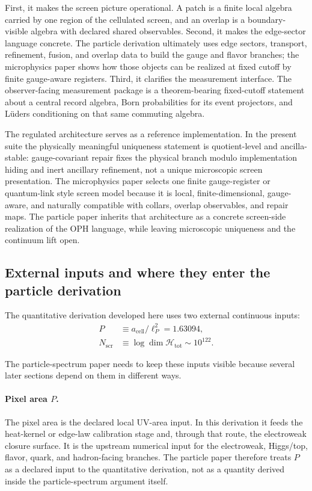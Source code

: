 \documentclass[11pt]{article}
\begin{document}
First, it makes the screen picture operational. A patch is a finite local algebra carried by one
region of the cellulated screen, and an overlap is a boundary-visible algebra with declared shared
observables. Second, it makes the edge-sector
language concrete. The particle derivation ultimately uses edge sectors, transport, refinement,
fusion, and overlap data to build the gauge and flavor branches; the microphysics paper shows
how those objects can be realized at fixed cutoff by finite gauge-aware registers.
Third, it clarifies the measurement interface. The observer-facing measurement package is a
theorem-bearing fixed-cutoff statement about a central record
algebra, Born probabilities for its event projectors, and L\"uders conditioning on that same
commuting algebra.

The regulated architecture serves as a reference implementation. In the present suite the
physically meaningful uniqueness statement is quotient-level and ancilla-stable: gauge-covariant
repair fixes the physical branch modulo implementation hiding and inert ancillary refinement, not
a unique microscopic screen presentation. The microphysics paper selects one finite
gauge-register or quantum-link style screen model because it is local, finite-dimensional,
gauge-aware, and naturally compatible with collars, overlap observables, and repair maps. The
particle paper inherits that architecture as a concrete screen-side realization of the OPH
language, while leaving microscopic uniqueness and the continuum lift open.

\subsection{External inputs and where they enter the particle derivation}

The quantitative derivation developed here uses two external continuous inputs:
\begin{align}
P &\equiv a_{\mathrm{cell}}/\ell_P^2 = 1.63094,\\
N_{\mathrm{scr}} &\equiv \log \dim \mathcal H_{\mathrm{tot}} \sim 10^{122}.
\end{align}

The particle-spectrum paper needs to keep these inputs visible because several later sections
depend on them in different ways.

\paragraph{Pixel area \(P\).}
The pixel area is the declared local UV-area input. In this derivation it feeds the
heat-kernel or edge-law calibration stage and, through that route, the electroweak
closure surface. It is the upstream numerical
input for the electroweak, Higgs/top, flavor, quark, and hadron-facing branches. The particle
paper therefore treats \(P\) as a declared input to the quantitative
derivation, not as a quantity derived inside the particle-spectrum argument itself.
\end{document}
